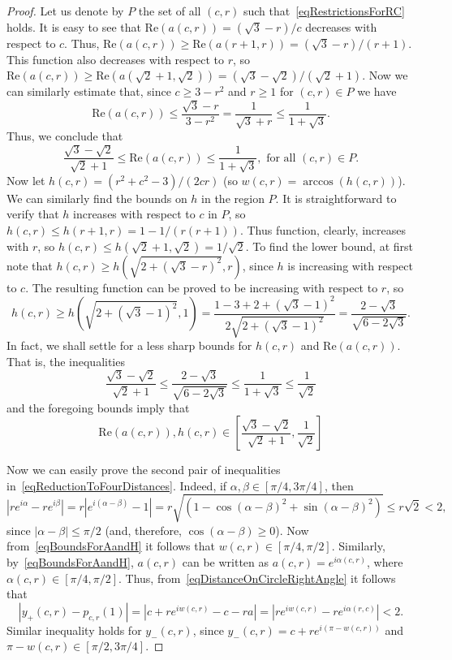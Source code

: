 \documentclass{amsart}
\numberwithin{equation}{section}
\theoremstyle{definition}
\theoremstyle{remark}
\begin{document}
\begin{proof}
		Let us denote by $P$ the set of all $(c,r)$ such that~\eqref{eqRestrictionsForRC} holds. It is easy to see that $\mathrm{Re}(a(c,r)) = (\sqrt{3} - r)/c$ decreases with respect to $c$. Thus, $\mathrm{Re}(a(c,r)) \ge \mathrm{Re}(a(r+1,r)) = (\sqrt{3} - r)/(r + 1)$. This function also decreases with respect to $r$, so $\mathrm{Re}(a(c,r)) \ge \mathrm{Re}(a(\sqrt{2} + 1, \sqrt{2})) = (\sqrt{3} - \sqrt{2})/(\sqrt{2} + 1)$. Now we can similarly estimate that, since $c \ge 3 - r^2$ and $r \ge 1$ for $(c,r) \in P$ we have
		\[
		\mathrm{Re}(a(c,r)) \le \dfrac{\sqrt{3} - r}{3 - r^2} = \dfrac{1}{\sqrt{3} + r} \le \dfrac{1}{1 + \sqrt{3}}.
		\]
		Thus, we conclude that 
		\[
		\dfrac{\sqrt{3} - \sqrt{2}}{\sqrt{2} + 1} \le \mathrm{Re}(a(c,r)) \le \dfrac{1}{1 + \sqrt{3}},\text{ for all }(c,r) \in P.
		\]
		Now let $h(c,r) = (r^2 + c^2 - 3)/(2cr)$ (so $w(c,r) = \arccos(h(c,r))$). We can similarly find the bounds on $h$ in the region $P$. It is straightforward to verify that $h$ increases with respect to $c$ in $P$, so $h(c,r) \le h(r+1,r) = 1 - 1/(r(r+1))$. Thus function, clearly, increases with $r$, so $h(c,r) \le h(\sqrt{2} + 1, \sqrt{2}) = 1/\sqrt{2}$. To find the lower bound, at first note that $h(c,r) \ge h\left(\sqrt{2 + (\sqrt{3} - r)^2}, r\right)$, since $h$ is increasing with respect to $c$. The resulting function can be proved to be increasing with respect to $r$, so
		\[
		h(c,r) \ge h\left(\sqrt{2 + (\sqrt{3} - 1)^2}, 1\right) = \dfrac{1 - 3 + 2 + (\sqrt{3} - 1)^2}{2\sqrt{2 + (\sqrt{3} - 1)^2}} = \dfrac{2 - \sqrt{3}}{\sqrt{6 - 2\sqrt{3}}}.
		\]
		In fact, we shall settle for a less sharp bounds for $h(c,r)$ and $\mathrm{Re}(a(c,r))$. That is, the inequalities
		\[
		\dfrac{\sqrt{3} - \sqrt{2}}{\sqrt{2} + 1} \le \dfrac{2 - \sqrt{3}}{\sqrt{6 - 2\sqrt{3}}} \le \dfrac{1}{1 + \sqrt{3}} \le \dfrac{1}{\sqrt{2}}
		\]
		and the foregoing bounds imply that
		\begin{equation}\label{eqBoundsForAandH}
			\mathrm{Re}(a(c,r)), h(c,r) \in \left[\dfrac{\sqrt{3} - \sqrt{2}}{\sqrt{2} + 1}, \dfrac{1}{\sqrt{2}}\right]
		\end{equation}
		
		Now we can easily prove the second pair of inequalities in~\eqref{eqReductionToFourDistances}. Indeed, if $\alpha, \beta \in [\pi/4, 3\pi/4]$, then 
		\begin{equation}\label{eqDistanceOnCircleRightAngle}
			|re^{i\alpha} - re^{i\beta}| = r|e^{i(\alpha - \beta)} - 1| = r\sqrt{(1 - \cos(\alpha - \beta)^2 + \sin(\alpha - \beta)^2)} \le r\sqrt{2} < 2,
		\end{equation}
		since $|\alpha - \beta| \le \pi/2$ (and, therefore, $\cos(\alpha - \beta) \ge 0$). Now from~\eqref{eqBoundsForAandH} it follows that $w(c,r) \in [\pi/4, \pi/2]$. Similarly, by~\eqref{eqBoundsForAandH}, $a(c,r)$ can be written as $a(c,r) = e^{i\alpha(c,r)}$, where $\alpha(c,r) \in [\pi/4, \pi/2]$. Thus, from~\eqref{eqDistanceOnCircleRightAngle} it follows that 
		\[
		|y_+(c,r) - p_{c,r}(1)| = |c + re^{iw(c,r)} - c - ra| = |re^{iw(c,r)} - re^{i\alpha(r,c)}| < 2.
		\]
		Similar inequality holds for $y_-(c,r)$, since $y_-(c,r) = c + re^{i(\pi - w(c,r))}$ and $\pi - w(c,r) \in [\pi/2, 3\pi/4]$.
		

\end{proof}
\end{document}
